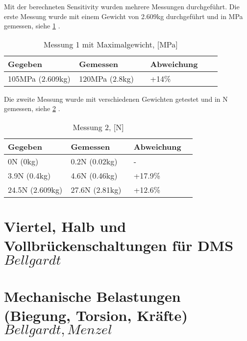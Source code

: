 

Mit der berechneten Sensitivity wurden mehrere Messungen durchgeführt.
Die erste Messung wurde mit einem Gewicht von 2.609kg durchgeführt und in MPa gemessen, siehe \ref{tbl:biegebalkenmessungeins} .

\bgroup
\def\arraystretch{2}
\begin{table}[h]
\centering
\begin{tabular}{|p{0.33\linewidth}|p{0.33\linewidth}|p{0.33\linewidth}|}
\hline
Gegeben & Gemessen & Abweichung \\ \hline
105MPa (2.609kg) & 120MPa (2.8kg) & +14\% \\ \hline
\end{tabular}
\caption{Messung 1 mit Maximalgewicht, [MPa]}
\label{tbl:biegebalkenmessungeins}

\end{table}
\egroup

Die zweite Messung wurde mit verschiedenen Gewichten getestet und in N gemessen, siehe \ref{tbl:biegebalkenmessungzwei} .
\bgroup
\def\arraystretch{2}
\begin{table}[h]
\centering
\begin{tabular}{|p{0.33\linewidth}|p{0.33\linewidth}|p{0.33\linewidth}|}
\hline
Gegeben & Gemessen & Abweichung \\ \hline
0N (0kg) & 0.2N (0.02kg) & - \\ \hline
3.9N (0.4kg) & 4.6N (0.46kg) & +17.9\%  \\ \hline
24.5N (2.609kg) & 27.6N (2.81kg)  & +12.6\% \\ \hline
\end{tabular}
\caption{Messung 2, [N]}
\label{tbl:biegebalkenmessungzwei}

\end{table}
\egroup


\section{Viertel\-, Halb\- und Vollbr\"uckenschaltungen für DMS \(Bellgardt\)}
\section{Mechanische Belastungen (Biegung, Torsion, Kr\"afte) \(Bellgardt, Menzel\)}